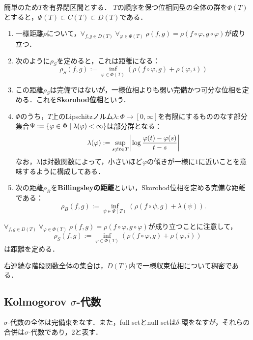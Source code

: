 \documentclass[uplatex,dvipdfmx]{jsreport}
\begin{document}
\begin{definition}
    簡単のため$T$を有界閉区間とする．
    $T$の順序を保つ位相同型の全体の群を$\Phi(T)$とすると，$\Phi(T)\subset C(T)\subset D(T)$である．
    \begin{enumerate}
        \item 一様距離$\rho$について，$\forall_{f,g\in D(T)}\;\forall_{\varphi\in\Phi(T)}\;\rho(f,g)=\rho(f\circ\varphi,g\circ\varphi)$が成り立つ．
        \item 次のように$\rho_S$を定めると，これは距離になる：
        \[\rho_S(f,g):=\inf_{\varphi\in\Phi(T)}(\rho(f\circ\varphi,g)+\rho(\varphi,i))\]
        \item この距離$\rho_S$は完備ではないが，一様位相よりも弱い完備かつ可分な位相を定める．これを\textbf{Skorohod位相}という．
        \item $\Phi$のうち，$T$上のLipschitzノルム$\lambda:\Phi\to[0,\infty]$を有限にするもののなす部分集合$\Psi:=\left\{\varphi\in\Phi\mid\lambda(\varphi)<\infty\right\}$は部分群となる：
        \[\lambda(\varphi):=\sup_{s\ne t\in T}\left|\log\frac{\varphi(t)-\varphi(s)}{t-s}\right|\]
        なお，$\lambda$は対数関数によって，小さいほど$\varphi$の傾きが一様に$1$に近いことを意味するように構成してある．
        \item 次の距離$\rho_B$を\textbf{Billingsleyの距離}といい，Skorohod位相を定める完備な距離である：
        \[\rho_B(f,g):=\inf_{\psi\in\Psi(T)}(\rho(f\circ\psi,g)+\lambda(\psi)).\]
    \end{enumerate}
    $\forall_{f,g\in D(T)}\;\forall_{\varphi\in\Phi(T)}\;\rho(f,g)=\rho(f\circ\varphi,g\circ\varphi)$が成り立つことに注意して，
    \[\rho_S(f,g):=\inf_{\varphi\in\Phi(T)}(\rho(f\circ\varphi,g)+\rho(\varphi,i))\]
    は距離を定める．
\end{definition}

\begin{proposition}
    右連続な階段関数全体の集合は，$D(T)$内で一様収束位相について稠密である．
\end{proposition}

\subsection{Kolmogorov $\sigma$-代数}

\begin{tcolorbox}[colframe=ForestGreen, colback=ForestGreen!10!white,breakable,colbacktitle=ForestGreen!40!white,coltitle=black,fonttitle=\bfseries\sffamily,
title=]
    $\sigma$-代数の全体は完備束をなす．また，full setとnull setは$\delta$-環をなすが，それらの合併は$\sigma$-代数であり，2と表す\cite{伊藤清確率論}．
\end{tcolorbox}
\end{document}
